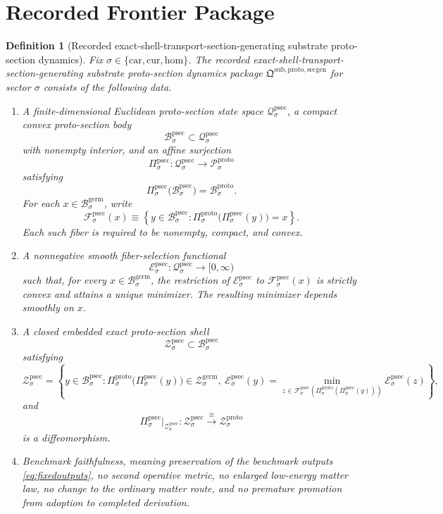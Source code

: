 \documentclass[11pt]{article}
\newcommand{\Car}{\mathrm{car}}
\newcommand{\Cur}{\mathrm{cur}}
\newcommand{\Hom}{\mathrm{hom}}
\newcommand{\GermBody}[1]{\mathcal B_{#1}^{\mathrm{germ}}}
\newcommand{\GermShell}[1]{\mathcal Z_{#1}^{\mathrm{germ}}}
\newcommand{\ProtoState}[1]{\mathcal P_{#1}^{\mathrm{proto}}}
\newcommand{\ProtoBody}[1]{\mathcal B_{#1}^{\mathrm{proto}}}
\newcommand{\ProtoProj}[1]{\Pi_{#1}^{\mathrm{proto}}}
\newcommand{\ProtoShell}[1]{\mathcal Z_{#1}^{\mathrm{proto}}}
\newcommand{\ProtoSectionPackage}{\mathfrak Q^{\mathrm{sub,proto,secgen}}}
\newcommand{\ProtoSectionState}[1]{\mathcal Q_{#1}^{\mathrm{psec}}}
\newcommand{\ProtoSectionBody}[1]{\mathcal B_{#1}^{\mathrm{psec}}}
\newcommand{\ProtoSectionProj}[1]{\Pi_{#1}^{\mathrm{psec}}}
\newcommand{\ProtoSectionFiber}[2]{\mathcal F_{#1}^{\mathrm{psec}}(#2)}
\newcommand{\ProtoSectionFunctional}[1]{\mathscr E_{#1}^{\mathrm{psec}}}
\newcommand{\ProtoSectionShell}[1]{\mathcal Z_{#1}^{\mathrm{psec}}}
\newtheorem{definition}{Definition}
\begin{document}
\section{Recorded Frontier Package}

\begin{definition}[Recorded exact-shell-transport-section-generating substrate proto-section dynamics]
\label{def:protosection}
Fix \(\sigma\in\{\Car,\Cur,\Hom\}\). The recorded exact-shell-transport-section-generating substrate proto-section dynamics package \(\ProtoSectionPackage\) for sector \(\sigma\) consists of the following data.
\begin{enumerate}
    \item A finite-dimensional Euclidean proto-section state space \(\ProtoSectionState{\sigma}\), a compact convex proto-section body
    \[
    \ProtoSectionBody{\sigma}\subset\ProtoSectionState{\sigma}
    \]
    with nonempty interior, and an affine surjection
    \[
    \ProtoSectionProj{\sigma}:\ProtoSectionState{\sigma}\to\ProtoState{\sigma}
    \]
    satisfying
    \[
    \ProtoSectionProj{\sigma}\bigl(\ProtoSectionBody{\sigma}\bigr)=\ProtoBody{\sigma}.
    \]
    For each \(x\in\GermBody{\sigma}\), write
    \[
    \ProtoSectionFiber{\sigma}{x}
    \equiv
    \left\{
    y\in\ProtoSectionBody{\sigma}:
    \ProtoProj{\sigma}\bigl(\ProtoSectionProj{\sigma}(y)\bigr)=x
    \right\}.
    \]
    Each such fiber is required to be nonempty, compact, and convex.
    \item A nonnegative smooth fiber-selection functional
    \[
    \ProtoSectionFunctional{\sigma}:\ProtoSectionState{\sigma}\to[0,\infty)
    \]
    such that, for every \(x\in\GermBody{\sigma}\), the restriction of \(\ProtoSectionFunctional{\sigma}\) to \(\ProtoSectionFiber{\sigma}{x}\) is strictly convex and attains a unique minimizer. The resulting minimizer depends smoothly on \(x\).
    \item A closed embedded exact proto-section shell
    \[
    \ProtoSectionShell{\sigma}\subset\ProtoSectionBody{\sigma}
    \]
    satisfying
    \[
    \ProtoSectionShell{\sigma}
    =
    \left\{
    y\in\ProtoSectionBody{\sigma}:
    \ProtoProj{\sigma}\bigl(\ProtoSectionProj{\sigma}(y)\bigr)\in\GermShell{\sigma},
    \;
    \ProtoSectionFunctional{\sigma}(y)
    =
    \min_{z\in\ProtoSectionFiber{\sigma}{\ProtoProj{\sigma}(\ProtoSectionProj{\sigma}(y))}}
    \ProtoSectionFunctional{\sigma}(z)
    \right\},
    \]
    and
    \[
    \ProtoSectionProj{\sigma}\big|_{\ProtoSectionShell{\sigma}}
    :
    \ProtoSectionShell{\sigma}
    \xrightarrow{\cong}
    \ProtoShell{\sigma}
    \]
    is a diffeomorphism.
    \item Benchmark faithfulness, meaning preservation of the benchmark outputs \eqref{eq:fixedoutputs}, no second operative metric, no enlarged low-energy matter law, no change to the ordinary matter route, and no premature promotion from adoption to completed derivation.
\end{enumerate}
\end{definition}
\end{document}
